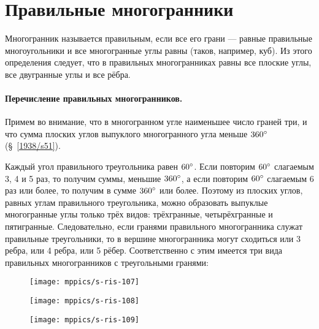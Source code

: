 {\small

\section{Правильные многогранники}

Многогранник называется правильным, если все его грани — равные правильные многоугольники и все многогранные углы равны (таков, например, куб).
Из этого определения следует, что в правильных многогранниках равны все плоские углы, все двугранные углы и все рёбра.

\paragraph{Перечисление правильных многогранников.}\label{1938/s97}
Примем во внимание, что в многогранном угле наименьшее число граней три, и что сумма плоских углов выпуклого многогранного угла меньше $360\degree$ (§~\ref{1938/s51}).

Каждый угол правильного треугольника равен $60\degree$.
Если повторим $60\degree$ слагаемым 3, 4 и 5 раз, то получим суммы, меньшие $360\degree$, а если повторим $60\degree$ слагаемым 6 раз или более, то получим в сумме $360\degree$ или более.
Поэтому из плоских углов, равных углам правильного треугольника, можно образовать выпуклые многогранные углы только трёх видов: трёхгранные, четырёхгранные и пятигранные.
Следовательно, если гранями правильного многогранника служат правильные треугольники, то в вершине многогранника могут сходиться или 3 ребра, или 4 ребра, или 5 рёбер.
Соответственно с этим имеется три вида правильных многогранников с треугольными гранями:

\begin{figure}[h]
\begin{minipage}{.32\textwidth}
\centering
\texttt{[image: mppics/s-ris-107]}
\end{minipage}\hfill
\begin{minipage}{.32\textwidth}
\centering
\texttt{[image: mppics/s-ris-108]}
\end{minipage}\hfill
\begin{minipage}{.32\textwidth}
\centering
\texttt{[image: mppics/s-ris-109]}
\end{minipage}

\medskip

\begin{minipage}{.32\textwidth}
\centering
\caption{}\label{1938/s-ris-107}
\end{minipage}\hfill
\begin{minipage}{.32\textwidth}
\centering
\caption{}\label{1938/s-ris-108}
\end{minipage}\hfill
\begin{minipage}{.32\textwidth}
\centering
\caption{}\label{1938/s-ris-109}
\end{minipage}
\vskip-4mm
\end{figure}

}
